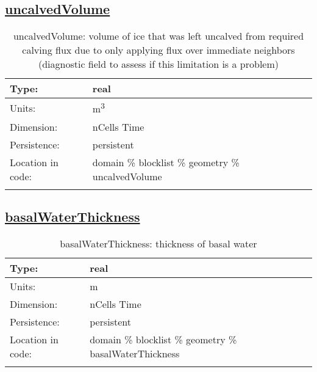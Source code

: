\subsection[uncalvedVolume]{\hyperref[sec:var_tab_geometry]{uncalvedVolume}}
\label{subsec:var_sec_geometry_uncalvedVolume}
\begin{center}
\begin{longtable}{| p{2.0in} | p{4.0in} |}
        \hline 
        Type: & real \\
        \hline 
        Units: & \si{m^3} \\
        \hline 
        Dimension: & nCells Time \\
        \hline 
        Persistence: & persistent \\
        \hline 
         Location in code: & domain \% blocklist \% geometry \% uncalvedVolume \\
         \hline 
    \caption{uncalvedVolume: volume of ice that was left uncalved from required calving flux due to only applying flux over immediate neighbors (diagnostic field to assess if this limitation is a problem)}
\end{longtable}
\end{center}
\subsection[basalWaterThickness]{\hyperref[sec:var_tab_geometry]{basalWaterThickness}}
\label{subsec:var_sec_geometry_basalWaterThickness}
\begin{center}
\begin{longtable}{| p{2.0in} | p{4.0in} |}
        \hline 
        Type: & real \\
        \hline 
        Units: & \si{m} \\
        \hline 
        Dimension: & nCells Time \\
        \hline 
        Persistence: & persistent \\
        \hline 
         Location in code: & domain \% blocklist \% geometry \% basalWaterThickness \\
         \hline 
    \caption{basalWaterThickness: thickness of basal water}
\end{longtable}
\end{center}

